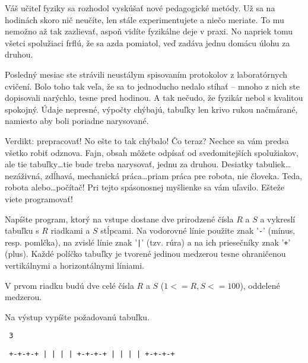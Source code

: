 




Váš učiteľ fyziky sa rozhodol vyskúšať nové pedagogické metódy. Už sa na
hodinách skoro nič neučíte, len stále experimentujete a niečo meriate. To mu
nemožno až tak zazlievať, aspoň vidíte fyzikálne deje v praxi. No napriek tomu
všetci spolužiaci frflú, že sa azda pomiatol, veď zadáva jednu domácu úlohu za
druhou.

Posledný mesiac ste strávili neustálym spisovaním protokolov z laboratórnych
cvičení. Bolo toho tak veľa, že sa to jednoducho nedalo stíhať -- mnoho z nich
ste dopisovali narýchlo, tesne pred hodinou. A tak nečudo, že fyzikár nebol s
kvalitou spokojný. Údaje nepresné, výpočty chýbajú, tabuľky len krivo rukou
načmárané, namiesto aby boli poriadne narysované.

Verdikt: prepracovať! No ešte to tak chýbalo! Čo teraz? Nechce sa vám predsa
všetko robiť odznova. Fajn, obsah môžete odpísať od svedomitejších spolužiakov,
ale tie tabuľky\dots tie bude treba narysovať, jednu za druhou. Desiatky
tabuliek\dots nezáživná, zdĺhavá, mechanická práca\dots priam práca pre robota,
nie človeka.  Teda, robota alebo\dots počítač! Pri tejto spásonosnej myšlienke
sa vám uľavilo.  Ešteže viete programovať!

\uloha
Napíšte program, ktorý na vstupe dostane dve prirodzené čísla $R$ a $S$ a
vykreslí tabuľku s $R$ riadkami a $S$ stĺpcami. Na vodorovné línie použite znak
'{\tt -}' (mínus, resp. pomlčka), na zvislé línie znak '{\tt |}' (tzv. rúra) a
na ich priesečníky znak '{\tt +}' (plus). Každé políčko tabuľky je tvorené
jedinou medzerou tesne ohraničenou vertikálnymi a horizontálnymi líniami.


V prvom riadku budú dve celé čísla $R$ a $S$ ($1 <= R, S <= 100$), oddelené 
medzerou.



Na výstup vypíšte požadovanú tabuľku.

\priklad
\vstup\tt{} 3

\vystup\tt\obeylines
+-+-+-+
| | | |
+-+-+-+
| | | |
+-+-+-+

\koniec



